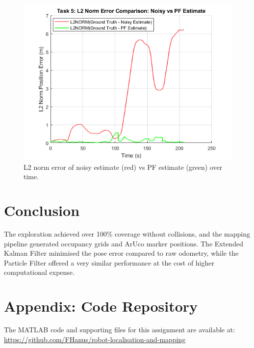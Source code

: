 \documentclass[conference]{IEEEtran}
\begin{document}
\begin{figure}[ht]
  \centering
  \includegraphics[width=\linewidth]{images/Task5_L2NORM_100kp.png}
  \caption{L2 norm error of noisy estimate (red) vs PF estimate (green) over time.}
  \label{fig:task5_l2norm}
\end{figure}

\section{Conclusion}
The exploration achieved over 100\% coverage without collisions, and the mapping pipeline generated occupancy grids and ArUco marker positions. The Extended Kalman Filter minimised the pose error compared to raw odometry, while the Particle Filter offered a very similar performance at the cost of higher computational expense.


\renewcommand{\thesection}{\Alph{section}}

\section*{Appendix: Code Repository}
The MATLAB code and supporting files for this assignment are available at:
\url{https://github.com/FHanus/robot-localisation-and-mapping}
\end{document}
